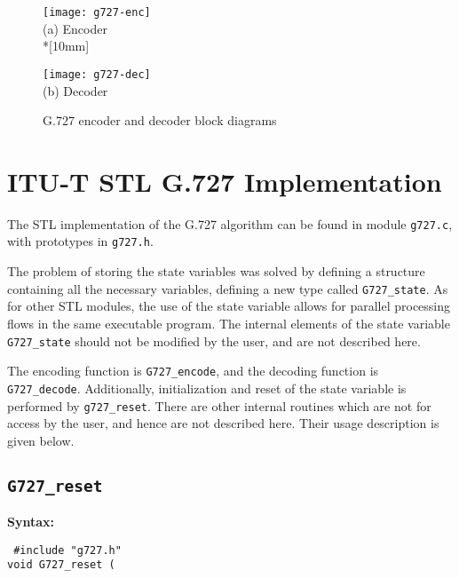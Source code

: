 \begin{figure}[hbtp]
  \begin{center}

   \texttt{[image: g727-enc]}\\

  (a) Encoder\\*[10mm]

  \texttt{[image: g727-dec]}\\

  (b) Decoder
  \end{center}

  \caption{G.727 encoder and decoder block diagrams
           \label{fig:G.727} }
\end{figure}


\section{ITU-T STL G.727 Implementation}

The STL implementation of the G.727 algorithm can be found
in module {\tt g727.c}, with prototypes in {\tt g727.h}.

The problem of storing the state variables was solved by defining a
structure containing all the necessary variables, defining a new type
called {\tt G727\_state}. As for other STL modules, the use of the
state variable allows for parallel processing flows in the same
executable program. The internal elements of the state variable {\tt
G727\_state} should not be modified by the user, and are not described
here.

The encoding function is {\tt G727\_encode}, and the decoding function
is {\tt G727\_decode}. Additionally, initialization and reset of the
state variable is performed by {\tt g727\_reset}. There are other
internal routines which are not for access by the user, and hence are
not described here. Their usage description is given below.

\subsection{{\tt G727\_reset}}

{\bf Syntax: }

{\tt
\#include "g727.h"\\
void G727\_reset
         (
}

